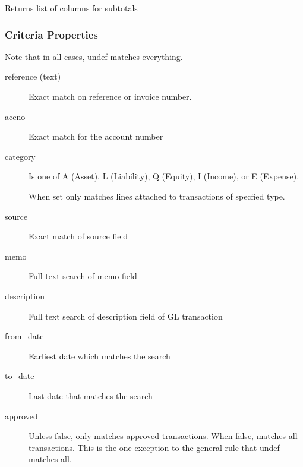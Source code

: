 \begin{description}
\begin{description}
\begin{description}
\begin{description}
\begin{description}
\begin{description}
\begin{description}
\begin{description}
\begin{description}
\begin{description}
\begin{description}
Returns list of columns for subtotals

\end{description}
\subsubsection*{Criteria Properties\label{LedgerSMB::DBObject::Report::GL_Criteria_Properties}}


Note that in all cases, undef matches everything.

\begin{description}

\item[{reference (text)}] \mbox{}

Exact match on reference or invoice number.


\item[{accno}] \mbox{}

Exact match for the account number


\item[{category}] \mbox{}

Is one of A (Asset), L (Liability), Q (Equity), I (Income), or E (Expense).



When set only matches lines attached to transactions of specfied type.


\item[{source}] \mbox{}

Exact match of source field


\item[{memo}] \mbox{}

Full text search of memo field


\item[{description}] \mbox{}

Full text search of description field of GL transaction


\item[{from\_date}] \mbox{}

Earliest date which matches the search


\item[{to\_date}] \mbox{}

Last date that matches the search


\item[{approved}] \mbox{}

Unless false, only matches approved transactions.  When false, matches all 
transactions.  This is the one exception to the general rule that undef matches
all.



\end{description}
\end{description}
\end{description}
\end{description}
\end{description}
\end{description}
\end{description}
\end{description}
\end{description}
\end{description}
\end{description}
